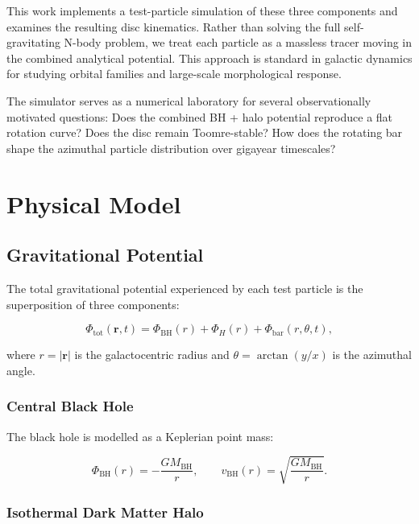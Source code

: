 \documentclass[12pt, letterpaper]{article}
\begin{document}
This work implements a test-particle simulation of these three components and examines the resulting disc kinematics. Rather than solving the full self-gravitating N-body problem, we treat each particle as a massless tracer moving in the combined analytical potential. This approach is standard in galactic dynamics for studying orbital families and large-scale morphological response.

The simulator serves as a numerical laboratory for several observationally motivated questions: Does the combined BH + halo potential reproduce a flat rotation curve? Does the disc remain Toomre-stable? How does the rotating bar shape the azimuthal particle distribution over gigayear timescales?

\section{Physical Model}
\label{sec:model}

\subsection{Gravitational Potential}

The total gravitational potential experienced by each test particle is the superposition of three components:

\begin{equation}
    \Phi_\text{tot}(\mathbf{r}, t) = \Phi_\text{BH}(r) + \Phi_H(r) + \Phi_\text{bar}(r, \theta, t),
\end{equation}

where $r = |\mathbf{r}|$ is the galactocentric radius and $\theta = \arctan(y/x)$ is the azimuthal angle.

\subsubsection{Central Black Hole}

The black hole is modelled as a Keplerian point mass:

\begin{equation}
    \Phi_\text{BH}(r) = -\frac{G M_\text{BH}}{r}, \qquad
    v_\text{BH}(r) = \sqrt{\frac{G M_\text{BH}}{r}}.
\end{equation}

\subsubsection{Isothermal Dark Matter Halo}
\end{document}

